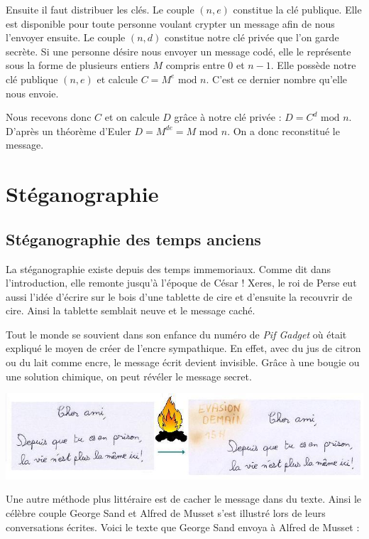 \documentclass[a4paper,12pt]{article}
\begin{document}
Ensuite il faut distribuer les clés. Le couple $(n, e)$ constitue la clé publique. Elle est disponible pour toute personne voulant crypter un message afin de nous l'envoyer ensuite. Le couple $(n, d)$ constitue notre clé privée que l'on garde secrète. Si une personne désire nous envoyer un message codé, elle le représente sous la forme de plusieurs entiers $M$ compris entre 0 et $n - 1$. Elle possède notre clé publique $(n, e)$ et calcule $C = M^{e} \textrm{ mod } n$. C'est ce dernier nombre qu'elle nous envoie.

Nous recevons donc $C$ et on calcule $D$ grâce à notre clé privée : $D = C^{d} \textrm{ mod } n$. D'après un théorème d'Euler $D = M^{de} = M \textrm{ mod } n$. On a donc reconstitué le message.

\section{Stéganographie}

\subsection{Stéganographie des temps anciens}

La stéganographie existe depuis des temps immemoriaux. Comme dit dans l'introduction, elle remonte jusqu'à l'époque de César ! Xeres, le roi de Perse eut aussi l'idée d'écrire sur le bois d'une tablette de cire et d'ensuite la recouvrir de cire. Ainsi la tablette semblait neuve et le message caché.

Tout le monde se souvient dans son enfance du numéro de \emph{Pif Gadget} où était expliqué le moyen de créer de l'encre sympathique. En effet, avec du jus de citron ou du lait comme encre, le message écrit devient invisible. Grâce à une bougie ou une solution chimique, on peut révéler le message secret.

\begin{center}
  \includegraphics[width=\textwidth]{../Image/histegano1.jpg}
\end{center}

Une  autre méthode  plus littéraire est de cacher le message dans du texte. Ainsi le célèbre couple George Sand et Alfred de Musset s'est illustré lors de leurs conversations écrites. Voici le texte que George Sand envoya à Alfred de Musset :
\end{document}
